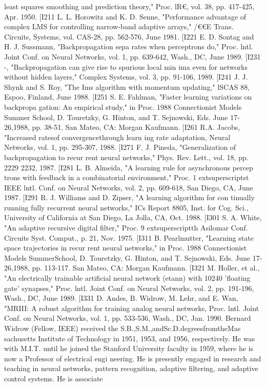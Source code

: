 \documentclass[11pt,a4paper,twocolumn]{article}
\begin{document}
{{least squares smoothing and prediction theory," Proc. lR€, 
vol. 38, pp. 417-425, Apr. 1950. 
[I211 L. L. Horowitz and K. D. Senne, "Performance advantage of 
complex LMS for controlling narrow-band adaptive arrays," 
/€€E Trans. Circuits, Systems, vol. CAS-28, pp. 562-576, June 
1981. 
[I221 E. D. Sontag and H. J. Sussmann, "Backpropagation sepa
rates when perceptrons do," Proc. lntl. Joint Conf. on Neural 
Networks, vol. 1, pp. 639-642, Wash., DC, June 1989. 
[I231 -, 
"Backpropagation can give rise to spurious local min
ima even for networks without hidden layers," Complex 
Systems, vol. 3, pp. 91-106, 1989. 
[I241 J. J. Shynk and S. Roy, "The Ims algorithm with momentum 
updating," lSCAS 88, Espoo, Finland, June 1988. 
[I251 S. E. Fahlman, "Faster learning variations on backpropa
gation: An empirical study," in Proc. 1988 Connectionist 
Models Summer School, D. Touretzky, G. Hinton, and T. 
Sejnowski, Eds. June 17-26,1988, pp. 38-51, San Mateo, CA: 
Morgan Kaufmann. 
[I261 R.A. Jacobs, "Increased ratesof convergencethrough learn
ing rate adaptation, Neural Networks, vol. 1, pp. 295-307, 
1988. 
[I271 F. J. Pineda, "Generalization of backpropagation to recur
rent neural networks," Phys. Rev. Lett., vol. 18, pp. 2229
2232, 1987. 
[I281 L. B. Almeida, "A learning rule for asynchronous percep
trons with feedback in a combinatorial environment," Proc. 
1	extsuperscript{st} IEEE lntl. Conf. on Neural Networks, vol. 2, pp. 609-618, 
San Diego, CA, June 1987. 
[I291 R. J. Williams and D. Zipser, "A learning algorithm for con
tinually running fully recurrent neural networks," ICs 
Report 8805, Inst. for Cog. Sci., University of California at 
San Diego, La Jolla, CA, Oct. 1988. 
[I301 S. A. White, "An adaptive recursive digital filter," Proc. 9	extsuperscript{th} 
Asilomar Conf. Circuits Syst. Comput., p. 21, Nov. 1975. 
[I311 B. Pearlmutter, "Learning state space trajectories in recur
rent neural networks," in Proc. 1988 Connectionist Models 
SummerSchool, D. Touretzky, G. Hinton, and T. Sejnowski, 
Eds. June 17-26,1988, pp. 113-117. San Mateo, CA: Morgan 
Kaufmann. 
[I321 M. Holler, et al., "An electrically trainable artificial neural 
network (etann) with 10240 'floating gate' synapses," Proc. 
lntl. Joint Conf. on Neural Networks, vol. 2, pp. 191-196, 
Wash., DC, June 1989. 
[I331 D. Andes, B. Widrow, M. Lehr, and E. Wan, "MRIII: A robust 
algorithm for training analog neural networks, Proc. lntl. 
Joint Conf. on Neural Networks, vol. 1, pp. 533-536, Wash., 
DC, Jan. 1990. 
Bernard Widrow (Fellow, IEEE) received the 
S.B.,S.M.,andSc.D.degreesfromtheMas
sachusetts Institute of Technology in 1951, 
1953, and 1956, respectively. 
He was with M.I.T. until he joined the 
Stanford University faculty in 1959, where 
he is now a Professor of electrical engi
neering. He is presently engaged in 
research and teaching in neural networks, 
pattern recognition, adaptive filtering, and 
adaptive control systems. He is associate 




}}
\end{document}
